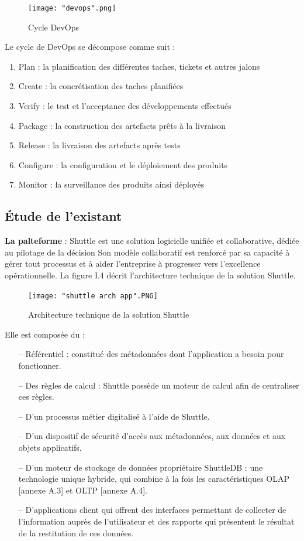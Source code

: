 \begin{spacing}{1.2}
\begin{figure}[H]\centering
\texttt{[image: "devops".png]}
\caption{Cycle DevOps}
\label{fig:fig3}
\end{figure}
Le cycle de DevOps se décompose comme suit : 
\begin{enumerate}
\setlength\itemsep{0em}
      \item Plan : la planification des différentes taches, tickets et autres jalons
      \item Create : la concrétisation des taches planifiées
      \item Verify : le test et l'acceptance des développements effectués
      \item Package : la construction des artefacts prêts à la livraison
      \item Release : la livraison des artefacts après tests
      \item Configure : la configuration et le déploiement des produits
      \item Monitor : la surveillance des produits ainsi déployés
\end{enumerate}

\subsection{Étude de l’existant}
\textbf{La palteforme} : Shuttle est une solution logicielle unifiée et collaborative, dédiée au pilotage de la décision Son modèle collaboratif est renforcé par sa capacité à gérer tout processus et à aider l'entreprise à progresser vers l'excellence opérationnelle. La figure I.4 décrit l'architecture technique de la solution Shuttle.
\begin{figure}[H]\centering
\texttt{[image: "shuttle arch app".PNG]}
\caption{Architecture technique de la solution Shuttle}
\label{fig:fig4}
\end{figure}
\FloatBarrier
Elle est composée du :
\begin{itemize}
    \setlength\itemsep{0em}
    \item[--] Référentiel : constitué des métadonnées dont l’application a besoin pour fonctionner.
    \item[--] Des règles de calcul : Shuttle possède  un moteur de calcul afin de centraliser ces règles.
    \item[--] D’un processus métier digitalisé à l’aide de Shuttle.
    \item[--] D’un dispositif de sécurité d’accès aux métadonnées, aux données et aux objets applicatifs.
    \item[--] D’un moteur de stockage de données propriétaire ShuttleDB : une technologie unique hybride, qui combine à la fois les caractéristiques OLAP [annexe A.3] et OLTP [annexe A.4].
    \item[--] D’applications client qui offrent des interfaces permettant de collecter de l’information auprès de l’utilisateur et des rapports qui présentent le résultat de la restitution de ces données.
\end{itemize}


\end{spacing}
